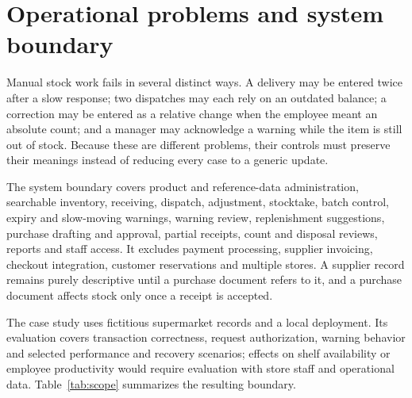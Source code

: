 \FloatBarrier

\section{Operational problems and system boundary}

Manual stock work fails in several distinct ways. A delivery may be entered twice after a slow response; two dispatches may each rely on an outdated balance; a correction may be entered as a relative change when the employee meant an absolute count; and a manager may acknowledge a warning while the item is still out of stock. Because these are different problems, their controls must preserve their meanings instead of reducing every case to a generic update.


The system boundary covers product and reference-data administration, searchable inventory, receiving, dispatch, adjustment, stocktake, batch control, expiry and slow-moving warnings, warning review, replenishment suggestions, purchase drafting and approval, partial receipts, count and disposal reviews, reports and staff access. It excludes payment processing, supplier invoicing, checkout integration, customer reservations and multiple stores. A supplier record remains purely descriptive until a purchase document refers to it, and a purchase document affects stock only once a receipt is accepted.


The case study uses fictitious supermarket records and a local deployment. Its evaluation covers transaction correctness, request authorization, warning behavior and selected performance and recovery scenarios; effects on shelf availability or employee productivity would require evaluation with store staff and operational data. Table~\ref{tab:scope} summarizes the resulting boundary.


